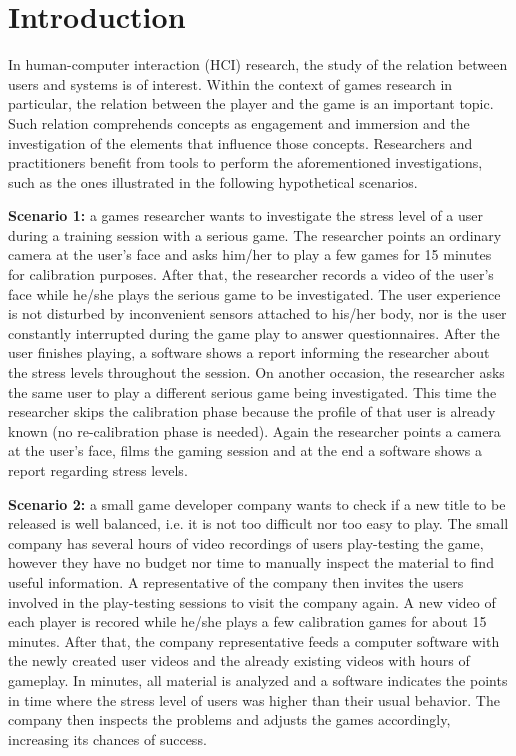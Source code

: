 \chapter{Introduction}
\label{c:introduction}

In human-computer interaction (HCI) research, the study of the relation between users and systems is of interest. Within the context of games research in particular, the relation between the player and the game is an important topic. Such relation comprehends concepts as engagement and immersion \parencite{boyle2012engagement} and the investigation of the elements that influence those concepts. Researchers and practitioners benefit from tools to perform the aforementioned investigations, such as the ones illustrated in the following hypothetical scenarios.

\textbf{Scenario 1:} a games researcher wants to investigate the stress level of a user during a training session with a serious game. The researcher points an ordinary camera at the user's face and asks him/her to play a few games for 15 minutes for calibration purposes. After that, the researcher records a video of the user's face while he/she plays the serious game to be investigated. The user experience is not disturbed by inconvenient sensors attached to his/her body, nor is the user constantly interrupted during the game play to answer questionnaires. After the user finishes playing, a software shows a report informing the researcher about the stress levels throughout the session. On another occasion, the researcher asks the same user to play a different serious game being investigated. This time the researcher skips the calibration phase because the profile of that user is already known (no re-calibration phase is needed). Again the researcher points a camera at the user's face, films the gaming session and at the end a software shows a report regarding stress levels.

\textbf{Scenario 2:} a small game developer company wants to check if a new title to be released is well balanced, i.e. it is not too difficult nor too easy to play. The small company has several hours of video recordings of users play-testing the game, however they have no budget nor time to manually inspect the material to find useful information. A representative of the company then invites the users involved in the play-testing sessions to visit the company again. A new video of each player is recored while he/she plays a few calibration games for about 15 minutes. After that, the company representative feeds a computer software with the newly created user videos and the already existing videos with hours of gameplay. In minutes, all material is analyzed and a software indicates the points in time where the stress level of users was higher than their usual behavior. The company then inspects the problems and adjusts the games accordingly, increasing its chances of success.

